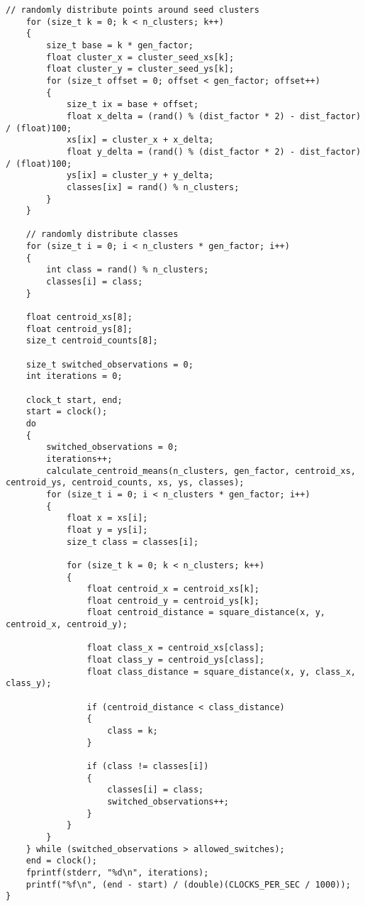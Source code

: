 \begin{lstlisting}[caption=k\_means.c]
    // randomly distribute points around seed clusters
    for (size_t k = 0; k < n_clusters; k++)
    {
        size_t base = k * gen_factor;
        float cluster_x = cluster_seed_xs[k];
        float cluster_y = cluster_seed_ys[k];
        for (size_t offset = 0; offset < gen_factor; offset++)
        {
            size_t ix = base + offset;
            float x_delta = (rand() % (dist_factor * 2) - dist_factor) / (float)100;
            xs[ix] = cluster_x + x_delta;
            float y_delta = (rand() % (dist_factor * 2) - dist_factor) / (float)100;
            ys[ix] = cluster_y + y_delta;
            classes[ix] = rand() % n_clusters;
        }
    }

    // randomly distribute classes
    for (size_t i = 0; i < n_clusters * gen_factor; i++)
    {
        int class = rand() % n_clusters;
        classes[i] = class;
    }

    float centroid_xs[8];
    float centroid_ys[8];
    size_t centroid_counts[8];

    size_t switched_observations = 0;
    int iterations = 0;

    clock_t start, end;
    start = clock();
    do
    {
        switched_observations = 0;
        iterations++;
        calculate_centroid_means(n_clusters, gen_factor, centroid_xs, centroid_ys, centroid_counts, xs, ys, classes);
        for (size_t i = 0; i < n_clusters * gen_factor; i++)
        {
            float x = xs[i];
            float y = ys[i];
            size_t class = classes[i];

            for (size_t k = 0; k < n_clusters; k++)
            {
                float centroid_x = centroid_xs[k];
                float centroid_y = centroid_ys[k];
                float centroid_distance = square_distance(x, y, centroid_x, centroid_y);

                float class_x = centroid_xs[class];
                float class_y = centroid_ys[class];
                float class_distance = square_distance(x, y, class_x, class_y);

                if (centroid_distance < class_distance)
                {
                    class = k;
                }

                if (class != classes[i])
                {
                    classes[i] = class;
                    switched_observations++;
                }
            }
        }
    } while (switched_observations > allowed_switches);
    end = clock();
    fprintf(stderr, "%d\n", iterations);
    printf("%f\n", (end - start) / (double)(CLOCKS_PER_SEC / 1000));
}
\end{lstlisting}

